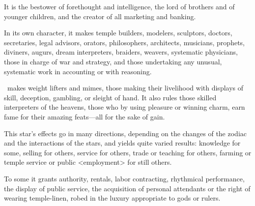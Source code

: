 It is the bestower of forethought and intelligence, the lord of brothers and of younger children, and the creator of all marketing and banking. 

In its own character, it makes temple builders, modelers, sculptors, doctors, secretaries, legal advisors, orators, philosophers, architects, musicians, prophets, diviners, augurs, dream interpreters, braiders, weavers, systematic physicians, those in charge of war and strategy, and those undertaking any unusual, systematic work in accounting or  with reasoning. 

\Mercury\, makes weight lifters and mimes, those making their livelihood with displays of skill, deception, gambling, or sleight of hand. It also rules those skilled interpreters of the heavens, those who by using pleasure or winning charm, earn fame for their amazing feats—all for the sake of gain. 

\mndl[0.2cm]
This star’s effects go in many directions, depending on the changes of the zodiac and the interactions of the stars, and yields quite varied results: knowledge for some, selling for others, service for others, trade or teaching for others, farming or temple service or public <employment> for still others. 

To some it grants authority, rentals, labor contracting, rhythmical performance, the display of public service, the acquisition of personal attendants or the right of wearing temple-linen, robed in the luxury appropriate to gods or rulers. 

